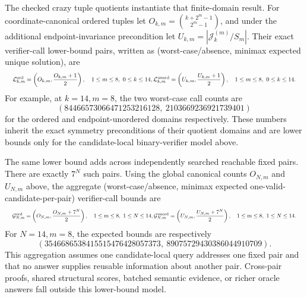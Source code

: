 \documentclass{article}
\newcommand{\fitmath}[1]{\resizebox{0.99\linewidth}{!}{$\displaystyle #1$}}
\begin{document}
The checked crazy tuple quotients instantiate that finite-domain result. For
coordinate-canonical ordered tuples let
$O_{k,m}=\binom{k+2^m-1}{2^m-1}$, and under the additional endpoint-invariance
precondition let $U_{k,m}=|\mathcal J^{(m)}_k/S_m|$. Their exact verifier-call
lower-bound pairs, written as (worst-case/absence, minimax expected unique
solution), are
\begin{equation}
  \fitmath{%
    \mathcal L^{\rm ord}_{k,m}
      =\left(O_{k,m},\frac{O_{k,m}+1}{2}\right),
      \quad 1\leq m\leq8,\ 0\leq k\leq14,\\
    \mathcal L^{\rm unord}_{k,m}
      =\left(U_{k,m},\frac{U_{k,m}+1}{2}\right),
      \quad 1\leq m\leq8,\ 0\leq k\leq14.
  }
  \label{eq:optimization-crazy-profile-tuple-verifier-call-lower-bound}
\end{equation}
For example, at $k=14,m=8$, the two worst-case call counts are
\[
  (84466573066471253216128,\ 2103669236921739401)
\]
for the ordered and endpoint-unordered domains respectively. These numbers
inherit the exact symmetry preconditions of their quotient domains and are lower
bounds only for the candidate-local binary-verifier model above.

The same lower bound adds across independently searched reachable fixed pairs.
There are exactly $7^N$ such pairs. Using the global canonical counts
$O_{N,m}$ and $U_{N,m}$ above, the aggregate (worst-case/absence, minimax
expected one-valid-candidate-per-pair) verifier-call bounds are
\begin{equation}
  \fitmath{%
    \mathcal G^{\rm ord}_{N,m}
      =\left(O_{N,m},\frac{O_{N,m}+7^N}{2}\right),
      \quad 1\leq m\leq8,\ 1\leq N\leq14,\\
    \mathcal G^{\rm unord}_{N,m}
      =\left(U_{N,m},\frac{U_{N,m}+7^N}{2}\right),
      \quad 1\leq m\leq8,\ 1\leq N\leq14.
  }
  \label{eq:optimization-crazy-global-tuple-verifier-call-lower-bound}
\end{equation}
For $N=14,m=8$, the expected bounds are respectively
\[
  (3546686538415515476428057373,\ 89075729430386044910709).
\]
This aggregation assumes one candidate-local query addresses one fixed pair and
that no answer supplies reusable information about another pair. Cross-pair
proofs, shared structural scores, batched semantic evidence, or richer oracle
answers fall outside this lower-bound model.
\end{document}
